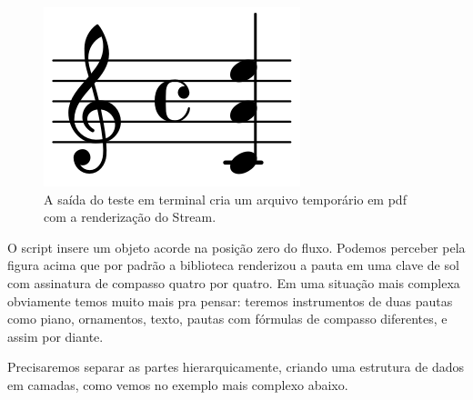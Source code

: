\documentclass[
	12pt,				%
	openright,			%
	twoside,			%
	a4paper,			%
	english,			%
	french,				%
	spanish,			%
	brazil				%
	]{abntex2}
\begin{document}
\begin{figure}[!h]
	\caption{\label{fig_grafico} A saída do teste em terminal cria um arquivo temporário em pdf com a renderização do Stream.}
	\begin{center}
	    \includegraphics[scale=0.3]{estudosM21/acorde01.png}
	\end{center}
\end{figure}

O script insere um objeto acorde na posição zero do fluxo. Podemos perceber pela figura acima que por padrão a biblioteca renderizou a pauta em uma clave de sol com assinatura de compasso quatro por quatro. Em uma situação mais complexa obviamente temos muito mais pra pensar: teremos instrumentos de duas pautas como piano, ornamentos, texto, pautas com fórmulas de compasso diferentes, e assim por diante.

Precisaremos separar as partes hierarquicamente, criando uma estrutura de dados em camadas, como vemos no exemplo mais complexo abaixo. 
\end{document}
